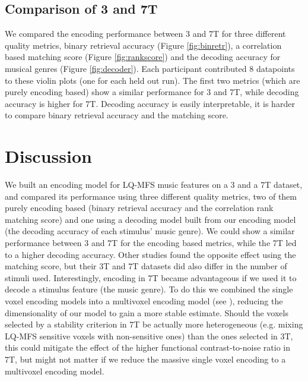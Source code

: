 \subsection*{Comparison of 3 and 7T}
We compared the encoding performance between 3 and 7T for three different quality metrics, binary retrieval accuracy (Figure \ref{fig:binretr}), a correlation based matching score (Figure \ref{fig:rankscore}) and the decoding accuracy for musical genres (Figure \ref{fig:decoder}). Each participant contributed 8 datapoints to these violin plots (one for each held out run). The first two metrics (which are purely encoding based) show a similar performance for 3 and 7T, while decoding accuracy is higher for 7T. Decoding accuracy is easily interpretable, it is harder to compare binary retrieval accuracy and the matching score.     


\section*{Discussion}

We built an encoding model for LQ-MFS music features on a 3 and a 7T dataset, and compared its performance using three different quality metrics, two of them purely encoding based (binary retrieval accuracy and the correlation rank matching score) and one using a decoding model built from our encoding model (the decoding accuracy of each stimulus' music genre). We could show a similar performance between 3 and 7T for the encoding based metrics, while the 7T led to a higher decoding accuracy. Other studies \cite{SF14} found the opposite effect using the matching score, but their 3T and 7T datasets did also differ in the number of stimuli used. Interestingly, encoding in 7T became advantageous if we used it to decode a stimulus feature (the music genre). To do this we combined the single voxel encoding models into a multivoxel encoding model (see \cite{NG09}), reducing the dimensionality of our model to gain a more stable estimate. Should the voxels selected by a stability criterion in 7T be actually more heterogeneous (e.g. mixing LQ-MFS sensitive voxels with non-sensitive ones) than the ones selected in 3T, this could mitigate the effect of the higher functional contrast-to-noise ratio in 7T, but might not matter if we reduce the massive single voxel encoding to a multivoxel encoding model.

